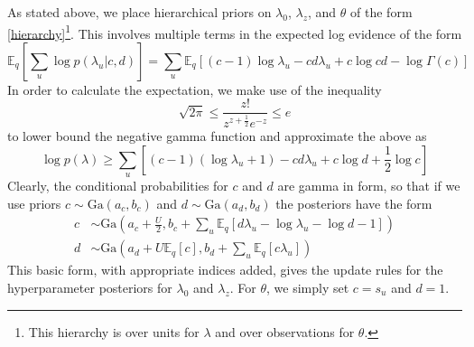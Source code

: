 \documentclass{article} %
\begin{document}
As stated above, we place hierarchical priors on $\lambda_0$, $\lambda_z$, and $\theta$ of the form \ref{hierarchy}\footnote{This hierarchy is over units for $\lambda$ and over observations for $\theta$.}. This involves multiple terms in the expected log evidence of the form
\begin{equation}
    \mathbb{E}_q \left[\sum_u \log p(\lambda_u|c, d)\right] = \sum_u \mathbb{E}_q \left[ 
    (c - 1) \log \lambda_u - cd\lambda_u + c \log cd - \log \Gamma(c) 
    \right] 
\end{equation}
In order to calculate the expectation, we make use of the inequality %
\begin{equation}
    \sqrt{2\pi} \le \frac{z!}{z^{z+\frac{1}{2}} e^{-z}} \le e
\end{equation}
to lower bound the negative gamma function and approximate the above as
\begin{equation}
    \log p(\lambda) \ge \sum_u \left[ 
    (c - 1) (\log \lambda_u + 1) - cd\lambda_u + c \log d + \frac{1}{2}\log c\right]
\end{equation}
Clearly, the conditional probabilities for $c$ and $d$ are gamma in form, so that if we use priors $c \sim \text{Ga}(a_c, b_c)$ and $d\sim \text{Ga}(a_d, b_d)$ the posteriors have the form
\begin{align}
    c &\sim \text{Ga}\left(a_c + \frac{U}{2}, 
    b_c + \sum_u\mathbb{E}_q 
        \left[d \lambda_u - \log \lambda_u - \log d - 1\right]\right) \\
    d &\sim \text{Ga}\left(
        a_d + U\mathbb{E}_q[c], b_d + \sum_u \mathbb{E}_q [c \lambda_u]
    \right)
\end{align}
This basic form, with appropriate indices added, gives the update rules for the hyperparameter posteriors for $\lambda_0$ and $\lambda_z$. For $\theta$, we simply set $c = s_u$ and $d = 1$.
\end{document}
